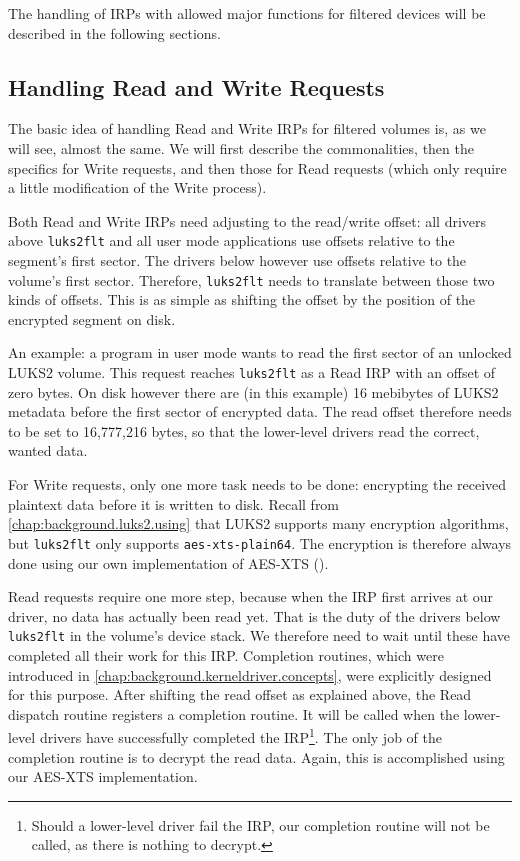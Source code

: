 The handling of IRPs with allowed major functions for filtered devices will be described in the following  sections.

\subsection{Handling Read and Write Requests}
\label{chap:ourapproach.final.de_encrypting}
The basic idea of handling Read and Write IRPs for filtered volumes is, as we will see, almost the same. We will first describe the commonalities, then the specifics for Write requests, and then those for Read requests (which only require a little modification of the Write process).

Both Read and Write IRPs need adjusting to the read/write offset: all drivers above \texttt{luks2flt} and all user mode applications use offsets relative to the segment's first sector. The drivers below however use offsets relative to the volume's first sector. Therefore, \texttt{luks2flt} needs to translate between those two kinds of offsets. This is as simple as shifting the offset by the position of the encrypted segment on disk.

An example: a program in user mode wants to read the first sector of an unlocked LUKS2 volume. This request reaches \texttt{luks2flt} as a Read IRP with an offset of zero bytes. On disk however there are (in this example) 16 mebibytes of LUKS2 metadata before the first sector of encrypted data. The read offset therefore needs to be set to 16,777,216 bytes, so that the lower-level drivers read the correct, wanted data.

For Write requests, only one more task needs to be done: encrypting the received plaintext data before it is written to disk. Recall from \autoref{chap:background.luks2.using} that LUKS2 supports many encryption algorithms, but \texttt{luks2flt} only supports \texttt{aes-xts-plain64}. The encryption is therefore always done using our own implementation of AES-XTS ().

Read requests require one more step, because when the IRP first arrives at our driver, no data has actually been read yet. That is the duty of the drivers below \texttt{luks2flt} in the volume's device stack. We therefore need to wait until these have completed all their work for this IRP. Completion routines, which were introduced in \autoref{chap:background.kerneldriver.concepts}, were explicitly designed for this purpose. After shifting the read offset as explained above, the Read dispatch routine registers a completion routine. It will be called when the lower-level drivers have successfully completed the IRP\footnote{\label{fn:ourapproach.final.failedlowerlevel} Should a lower-level driver fail the IRP, our completion routine will not be called, as there is nothing to decrypt.}. The only job of the completion routine is to decrypt the read data. Again, this is accomplished using our AES-XTS implementation.

